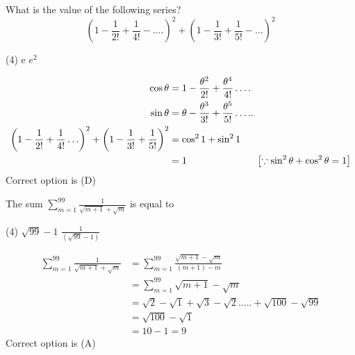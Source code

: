\begin{questions}
\begin{minipage}{\textwidth}
	\question What is the value of the following series?
	$$\left(1-\frac{1}{2 !}+\frac{1}{4 !}-\ldots .\right)^{2}+\left(1-\frac{1}{3 !}+\frac{1}{5 !}-\ldots\right)^{2}$$
\end{minipage}
\begin{tasks}(4)
	\task[\textbf{B.}]e
	\task[\textbf{C.}]$e^{2}$
\end{tasks}
\begin{answer}
	\begin{align*}
	\cos \theta&=1-\frac{\theta^{2}}{2 !}+\frac{\theta^{4}}{4 !} \ldots . \\ \sin \theta&=\theta-\frac{\theta^{3}}{3 !}+\frac{\theta^{5}}{5 !} \ldots . .\\
	\left(1-\frac{1}{2 !}+\frac{1}{4 !} \ldots\right)^{2}+\left(1-\frac{1}{3 !}+\frac{1}{5 !}\right)^{2}&=\cos ^{2} 1+\sin ^{2} 1\\&=1 \hspace{2.5cm}\left[\because \sin ^{2} \theta+\cos ^{2} \theta=1\right]
	\end{align*}
	Correct option is (D)
\end{answer}

\begin{minipage}{\textwidth}
	\question The sum $\sum_{m=1}^{99} \frac{1}{\sqrt{m+1}+\sqrt{m}}$ is equal to\\
\end{minipage}
\begin{tasks}(4)
	\task[\textbf{B.}]$\sqrt{99}-1$
	\task[\textbf{C.}]$\frac{1}{(\sqrt{99}-1)}$
\end{tasks}
\begin{answer}
	\begin{align*}
	\sum_{m=1}^{99} \frac{1}{\sqrt{m+1}+\sqrt{m}}&=\sum_{m=1}^{99} \frac{\sqrt{m+1}-\sqrt{m}}{(m+1)-m}\\&=\sum_{m=1}^{99} \sqrt{m+1}-\sqrt{m}\\
	&=\sqrt{2}-\sqrt{1}+\sqrt{3}-\sqrt{2} \ldots . .+\sqrt{100}-\sqrt{99}\\&=\sqrt{100}-\sqrt{1}\\&=10-1=9
	\end{align*}
	Correct option is (A)
\end{answer}


\end{questions}
